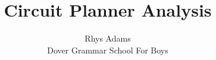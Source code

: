 \title{Circuit Planner Analysis}

\author{Rhys Adams\\ Dover Grammar School For Boys}

\maketitle
\newpage
